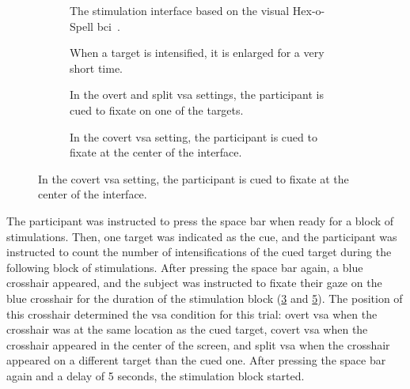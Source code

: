 \begin{figure}
  \begin{subfigure}[t]{.45\textwidth}
    
    \caption[The stimulation interface.]{The stimulation interface based on the visual Hex-o-Spell
    \acs{bci}~\cite{Treder2010}.}
    \label{fig:covert-align/interface/interface}
  \end{subfigure}\hfill%
  \begin{subfigure}[t]{.45\textwidth}
    
    \caption[Intensification.]{When a target is intensified, it is enlarged for
    a very short time.}
    \label{fig:covert-align/interface/intensification}
  \end{subfigure}

  \begin{subfigure}[t]{.45\textwidth}
    
    \caption[Gaze fixated on a target.]{In the overt and split \ac{vsa}
    settings, the
    participant is cued to fixate on one of the targets.}
    \label{fig:covert-align/interface/overt}
  \end{subfigure}\hfill%
  \begin{subfigure}[t]{.45\textwidth}
    
    \caption[Gaze fixated centrally.]{In the covert \ac{vsa} setting, the participant is
    cued to fixate at the center of the interface.}
    \label{fig:covert-align/interface/covert}
  \end{subfigure}
\end{figure}

The participant was instructed to press the space bar when ready for a block
of stimulations.
Then, one target was indicated as the cue, and the participant
was instructed to count the number of intensifications of the cued target
during the following block of stimulations.
After pressing the space bar again, a blue crosshair appeared, and the subject
was instructed to fixate their gaze on the blue crosshair for the duration of
the stimulation block (\cref{fig:covert-align/interface/overt} and
\cref{fig:covert-align/interface/covert}).
The position of this crosshair determined the \ac{vsa} condition for this trial:
overt \ac{vsa} when the crosshair was at the same location as the cued target,
covert \ac{vsa} when the crosshair appeared in the center of the screen, and split
\ac{vsa} when the crosshair appeared on a different target than the cued one.
After pressing the space bar again and a delay of 5 seconds, the stimulation block
started.

